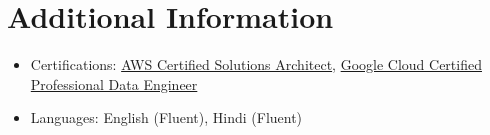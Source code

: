 \documentclass[a4paper,10pt]{article} %
\begin{document}
\section*{Additional Information}
\begin{itemize}[leftmargin=0.3in, itemsep=3pt, topsep=2pt]
    \item Certifications: \href{https://aws.amazon.com/certification/certified-solutions-architect-associate/}{AWS Certified Solutions Architect}, \href{https://cloud.google.com/certification/data-engineer}{Google Cloud Certified Professional Data Engineer}
    \item Languages: English (Fluent), Hindi (Fluent)
\end{itemize}
\end{document}
